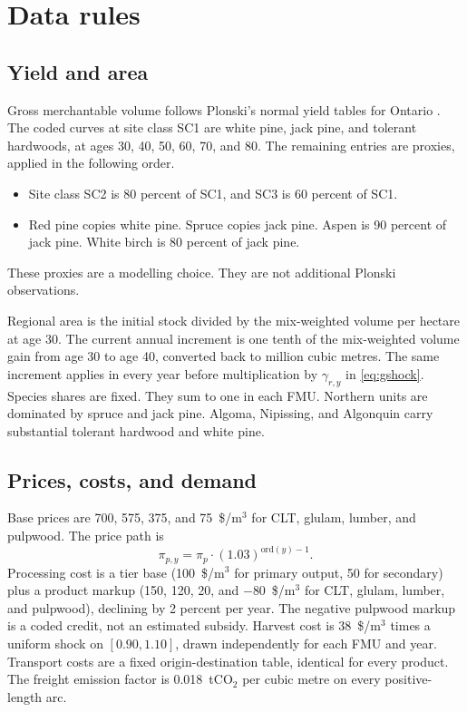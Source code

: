 \documentclass[11pt]{article}
\begin{document}
\section{Data rules}
\label{sec:data}

\subsection{Yield and area}

Gross merchantable volume follows Plonski's normal yield tables for Ontario \cite{plonski1981}. The coded curves at site class SC1 are white pine, jack pine, and tolerant hardwoods, at ages 30, 40, 50, 60, 70, and 80. The remaining entries are proxies, applied in the following order.
\begin{itemize}
\item Site class SC2 is 80 percent of SC1, and SC3 is 60 percent of SC1.
\item Red pine copies white pine. Spruce copies jack pine. Aspen is 90 percent of jack pine. White birch is 80 percent of jack pine.
\end{itemize}
These proxies are a modelling choice. They are not additional Plonski observations.

Regional area is the initial stock divided by the mix-weighted volume per hectare at age 30. The current annual increment is one tenth of the mix-weighted volume gain from age 30 to age 40, converted back to million cubic metres. The same increment applies in every year before multiplication by $\gamma_{r,y}$ in \eqref{eq:gshock}. Species shares are fixed. They sum to one in each FMU. Northern units are dominated by spruce and jack pine. Algoma, Nipissing, and Algonquin carry substantial tolerant hardwood and white pine.

\subsection{Prices, costs, and demand}

Base prices are 700, 575, 375, and 75~\$/m$^3$ for CLT, glulam, lumber, and pulpwood. The price path is
\begin{equation}
\pi_{p,y} = \pi_p \cdot (1.03)^{\mathrm{ord}(y)-1}.
\end{equation}
Processing cost is a tier base (100~\$/m$^3$ for primary output, 50 for secondary) plus a product markup (150, 120, 20, and $-80$~\$/m$^3$ for CLT, glulam, lumber, and pulpwood), declining by 2 percent per year. The negative pulpwood markup is a coded credit, not an estimated subsidy. Harvest cost is 38~\$/m$^3$ times a uniform shock on $[0.90, 1.10]$, drawn independently for each FMU and year. Transport costs are a fixed origin-destination table, identical for every product. The freight emission factor is 0.018~tCO$_2$ per cubic metre on every positive-length arc.
\end{document}
